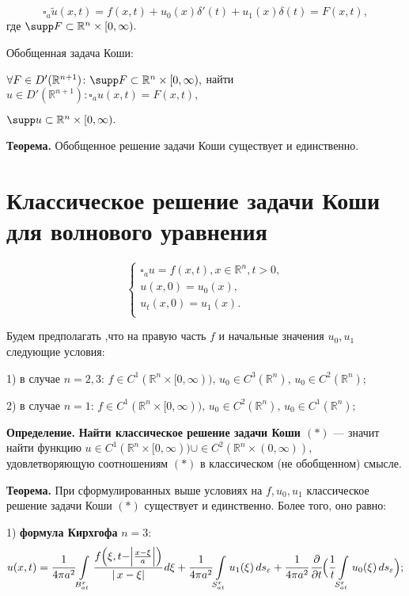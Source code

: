 \documentclass[unicode,12pt,draft]{article}
\begin{document}
$$\square_a \tilde u(x,t)=f(x,t)+u_0(x)\delta'(t)+u_1(x)\delta(t)=F(x,t),$$
где $\supp F\subset \mathbb R^n\times[0,\infty).$

Обобщенная задача Коши:

$\forall F\in D'(\mathbb R^{n+1})\colon \supp F\subset \mathbb
R^n\times[0,\infty),$ найти $u\in D'(\mathbb R^{n+1})\colon
\square_a u(x,t)=F(x,t),$

 $\supp u\subset \mathbb
R^n\times[0,\infty).$

\textbf{Теорема.} Обобщенное решение задачи Коши существует и
единственно.

\section{Классическое решение задачи Коши\\для волнового уравнения}

$$\left\{%
\begin{array}{ll}
    \square_a u=f(x,t),x\in \mathbb R^n,t>0,\\
    u(x,0)=u_0(x),\\
    u_t(x,0)=u_1(x). \\
\end{array}%
\right.$$

Будем предполагать ,что на правую часть $f$ и начальные значения
$u_0,u_1$ следующие условия:

1) в случае $n=2,3$: $f\in C^1(\mathbb R^n\times[0,\infty)),\,
u_0\in C^3(\mathbb R^n),\,u_0\in C^2(\mathbb R^n);$

2) в случае $n=1$: $f\in C^1(\mathbb R^n\times[0,\infty)),\,
u_0\in C^2(\mathbb R^n),\,u_0\in C^1(\mathbb R^n);$

\textbf{Определение.} \textbf{Найти классическое решение задачи
Коши $(*)$} --- значит найти функцию $u\in C^1(\mathbb
R^n\times[0,\infty))\cup\in C^2(\mathbb R^n\times(0,\infty)),$
удовлетворяющую соотношениям $(*)$ в классическом (не обобщенном)
смысле.

\textbf{Теорема.} При сформулированных выше условиях на
$f,u_0,u_1$ классическое решение задачи Коши $(*)$ существует и
единственно. Более того, оно равно:

1) \textbf{формула Кирхгофа} $n=3$:
$$u(x,t)=
\cfrac1{4\pi
a^2}\int\limits_{B_{at}^x}\cfrac{f\Bigl(\xi,t-\Bigr|\frac{x-\xi}a\Bigl|\Bigr)}{|\,x-\xi|}\,d\xi+
\cfrac1{4\pi a^2} \int\limits_{S_{at}^x}u_1(\xi)\,
ds_{\varepsilon}+ \cfrac1{4\pi a^2}\, \cfrac{\partial}{\partial
t}\Bigl(\cfrac1t\int\limits_{S_{at}^x}u_0(\xi)\,
ds_{\varepsilon}\Bigr);$$
\end{document}

